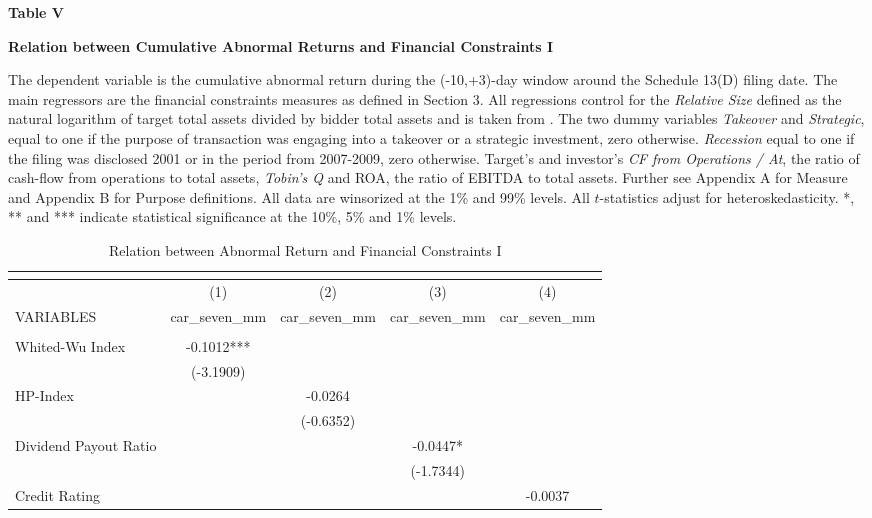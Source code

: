 \documentclass[12pt]{article}
\begin{document}
\begin{table}[!htbp]
	\centering
	\captionsetup{textformat=empty,labelformat=blank}
	\caption{Relation between Abnormal Return and Financial Constraints I}
	\textbf{Table V}\par\medskip
	\large\textbf{Relation between Cumulative Abnormal Returns and Financial Constraints I}\par\medskip
	\justifying
	\footnotesize\noindent{} The dependent variable is the cumulative abnormal return during the (-10,+3)-day window around the Schedule 13(D) filing date. The main regressors are the financial constraints measures as defined in Section 3. All regressions control for the \emph{Relative Size} defined as the natural logarithm of target total assets divided by bidder total assets and is taken from \citet[p.112]{Khatami2014}. The two dummy variables \emph{Takeover} and \emph{Strategic}, equal to one if the purpose of transaction was engaging into a takeover or a strategic investment, zero otherwise. \emph{Recession} equal to one if the filing was disclosed 2001 or in the period from 2007-2009, zero otherwise. Target's and investor's \emph{CF from Operations / At}, the ratio of cash-flow from operations to total assets, \emph{Tobin's Q} and ROA, the ratio of EBITDA to total assets. Further see Appendix A for Measure and Appendix B for Purpose definitions. All data are winsorized at the 1\% and 99\% levels. All $t$-statistics adjust for heteroskedasticity. *, ** and *** indicate statistical significance at the 10\%, 5\% and 1\% levels. \par\medskip									
	\begin{adjustbox}{max width=\textwidth}
		\begin{tabular}{lcccc}
			\multicolumn{5}{c}{} \\ \hline
			 & (1) & (2) & (3) & (4) \\
			VARIABLES & car\_seven\_mm & car\_seven\_mm & car\_seven\_mm & car\_seven\_mm \\ \hline
			 &  &  &  &  \\
			Whited-Wu Index & -0.1012*** &  &  &  \\
			 & (-3.1909) &  &  &  \\
			HP-Index &  & -0.0264 &  &  \\
			 &  & (-0.6352) &  &  \\
			Dividend Payout Ratio &  &  & -0.0447* &  \\
			 &  &  & (-1.7344) &  \\
			Credit Rating &  &  &  & -0.0037 \\

\end{tabular}
\end{adjustbox}
\end{table}
\end{document}
